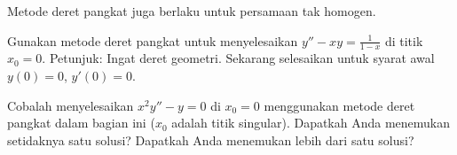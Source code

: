 \pagebreak[2]
\begin{exercise}[menantang]
Metode deret pangkat juga berlaku untuk persamaan tak homogen.
\begin{tasks}
\task Gunakan metode deret pangkat untuk menyelesaikan $y'' - x y = \frac{1}{1-x}$
di titik $x_0 = 0$. Petunjuk: Ingat deret geometri.
\task Sekarang selesaikan untuk syarat awal $y(0)=0$, $y'(0)=0$.
\end{tasks}
\end{exercise}

\begin{exercise}
Cobalah menyelesaikan $x^2 y'' - y = 0$ di $x_0 = 0$ menggunakan metode deret pangkat
dalam bagian ini ($x_0$ adalah titik singular).
Dapatkah Anda menemukan setidaknya satu solusi? Dapatkah Anda menemukan lebih dari satu solusi?
\end{exercise}

